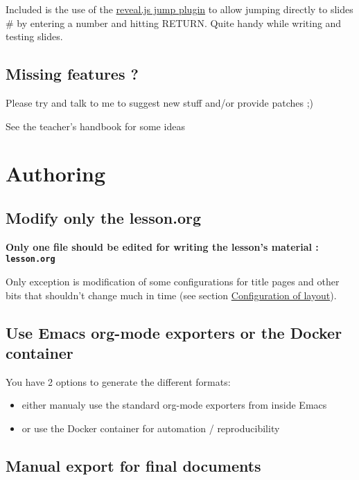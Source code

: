 \documentclass[a4paper]{article}
\begin{document}
Included is the use of the
\href{https://github.com/SethosII/reveal.js-jump-plugin}{reveal.js jump
plugin} to allow jumping directly to slides \# by entering a number
and hitting RETURN. Quite handy while writing and testing slides.

\subsection{Missing features ?}
\label{sec:org5bd4cab}

Please try and talk to me to suggest new stuff and/or provide patches ;)

\begin{NOTES}
See the teacher's handbook for some ideas
\end{NOTES}

\section{Authoring}
\label{sec:org654f9ed}
\subsection{Modify only the lesson.org}
\label{sec:org788821e}

\textbf{Only one file should be edited for writing the lesson's material : \texttt{lesson.org}}

Only exception is modification of some configurations for title pages
and other bits that shouldn't change much in time (see section \hyperref[sec:org552a672]{Configuration of layout}).

\subsection{Use Emacs org-mode exporters or the Docker container}
\label{sec:org9cb4141}

You have 2 options to generate the different formats:
\begin{itemize}
\item either manualy use the standard org-mode exporters from inside Emacs
\item or use the Docker container for automation / reproducibility
\end{itemize}

\subsection{Manual export for final documents}
\label{sec:org0c7613c}
\end{document}
